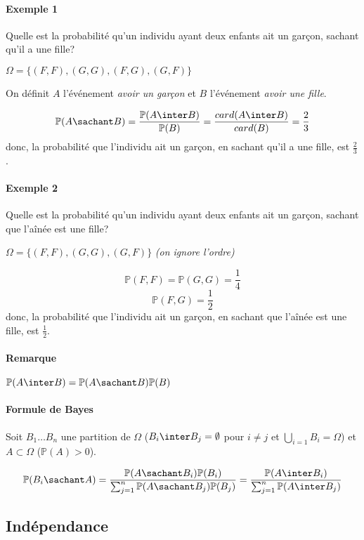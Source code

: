 \documentclass[a4paper,10pt,french,openany]{memoir}
\newcommand{\Proba}{\mathbb{P}}
\begin{document}
\paragraph{Exemple 1}
Quelle est la probabilité qu'un individu ayant deux enfants ait un garçon, sachant qu'il a une fille?

$\Omega = \lbrace (F,F), (G,G), (F,G), (G,F) \rbrace$

On définit $A$ l'événement \emph{avoir un garçon} et $B$ l'événement \emph{avoir une fille}.

\[ \Proba(A \sachant B) = \frac{\Proba(A \inter B)}{\Proba(B)} = \frac{card(A \inter B)}{card(B)} = \frac{2}{3} \]
donc, la probabilité que l'individu ait un garçon, en sachant qu'il a une fille, est $\frac 2 3$.

\paragraph{Exemple 2}
Quelle est la probabilité qu'un individu ayant deux enfants ait un garçon, sachant que l'aînée est une fille?

$\Omega = \lbrace (F,F), (G,G), (G,F) \rbrace$ \textit{(on ignore l'ordre)}

\[ \Proba(F,F)=\Proba(G,G)=\frac 1 4 \]
\[ \Proba(F,G)=\frac 1 2 \]
donc, la probabilité que l'individu ait un garçon, en sachant que l'aînée est une fille, est $\frac 1 2$.

\paragraph{Remarque}
$\Proba(A \inter B) = \Proba(A \sachant B) \Proba(B)$

\paragraph{Formule de Bayes}
Soit $B_1 \dots B_n$ une partition de $\Omega$ ($B_i \inter B_j = \emptyset$ pour $i \neq j$ et $\bigcup_{i=1} B_i = \Omega$) et $A \subset \Omega$ ($\Proba(A) > 0$).

\[
\Proba(B_i \sachant A) = \frac{\Proba(A \sachant B_i) \Proba(B_i)}{\sum_{j=1}^n \Proba(A \sachant B_j) \Proba(B_j)} = \frac{\Proba(A \inter B_i)}{\sum_{j=1}^n \Proba(A \inter B_j)}
\]

\subsection{Indépendance}
\end{document}
